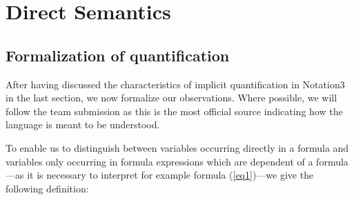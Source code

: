 \section{Direct Semantics}

\subsection{Formalization of quantification}\label{formal}
After having discussed the characteristics of implicit quantification in Notation3 in the last section, we now formalize our observations. 
Where possible, we will follow the team submission \cite{Notation3} as this is the most official source indicating how the language is meant to be understood.

To enable us to distinguish between variables occurring directly in a formula and variables only occurring in formula expressions which are dependent of a formula---as 
it is necessary to interpret for example formula (\ref{eq1})---we give the following definition: 








